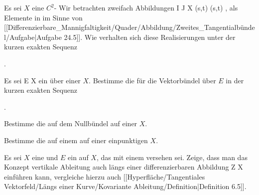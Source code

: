 {}
{

Es sei $X$ eine
$C^2$-
Wir betrachten zweifach
Abbildungen
\maabbeledisp {\varphi} {I \times J} {X
} {(s,t)} { \varphi(s,t)
} {,}
als Elemente in
 im Sinne von
[[Differenzierbare_Mannigfaltigkeit/Quader/Abbildung/Zweites_Tangentialbündel/Aufgabe|Aufgabe 24.5]].
Wie verhalten sich diese Realisierungen unter der kurzen exakten Sequenz

 { . }

}
{} {}

{}
{

Es sei
\maabb {} { E } { X
} {}
ein
über einer
$X$. Bestimme die
für die Vektorbündel über $E$  in der kurzen exakten Sequenz

 { . }

}
{} {}

{}
{

Bestimme die
auf dem Nullbündel auf einer
$X$.

}
{} {}

{}
{

Bestimme die
auf einem
auf einer einpunktigen
$X$.

}
{} {}

{}
{

Es sei $X$ eine
und $E$ ein
auf $X$, das mit einem
versehen sei. Zeige, dass man das Konzept vertikale Ableitung auch längs einer differenzierbaren Abbildung
\maabbdisp {\psi} { Z } { X
} {}
einführen kann, vergleiche hierzu auch
[[Hyperfläche/Tangentiales Vektorfeld/Längs einer Kurve/Kovariante Ableitung/Definition|Definition 6.5]].

}
{} {}

